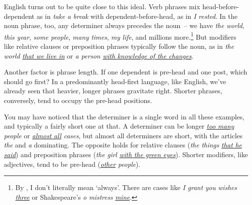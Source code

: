 English turns out to be quite close to this ideal. Verb phrases mix head-before-dependent as in \textit{take a break} with dependent-before-head, as in \textit{I rested}. In the noun phrase, too, any determiner always precedes the noun~-- we have \textit{the world}, \textit{this year}, \textit{some people}, \textit{many times}, \textit{my life}, and millions more.\footnote{By , I don't literally mean `always'. There are cases like \textit{I grant you wishes \uline{three}} or Shakespeare's \textit{o mistress \uline{mine}}.} But modifiers like relative clauses or preposition phrases typically follow the noun, as in \textit{the world \uline{that we live in}} or \textit{a person \uline{with knowledge of the changes}}.

Another factor is phrase length. If one dependent is pre-head and one post, which should go first? In a predominantly head-first language, like English, we've already seen that heavier, longer phrases gravitate right. Shorter phrases, conversely, tend to occupy the pre-head positions.

You may have noticed that the determiner is a single word in all these examples, and typically a fairly short one at that. A determiner can be longer \textit{\uline{too many} people} or \textit{\uline{almost all} cases}, but almost all determiners are short, with the articles \textit{the} and \textit{a} dominating. The opposite holds for relative clauses (\textit{the things \uline{that he said}}) and preposition phrases (\textit{the girl \uline{with the green eyes}}). Shorter modifiers, like adjectives, tend to be pre-head (\textit{\uline{other} people}).



